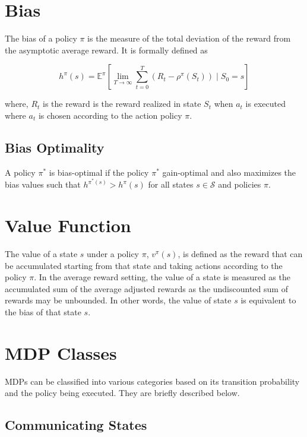\section{Bias}

The bias of a policy $\pi$ is the measure of the total deviation of the reward from the asymptotic average reward.
It is formally defined as

\begin{equation}
    \label{eqn:bias}
    h^\pi(s) = \mathbb{E}^\pi\left[\lim_{T \to \infty} \sum_{t=0}^{T} (R_t - \rho^\pi(S_t)) \mid S_0 = s\right]
\end{equation}

where, $R_t$ is the reward is the reward realized in state $S_t$ when $a_t$ is executed where $a_t$ is chosen according to the action policy $\pi$.

\subsection*{Bias Optimality}

A policy $\pi^*$ is bias-optimal if the policy $\pi^*$ gain-optimal and also maximizes the bias values such that $h^{\pi^*(s)} > h^\pi(s)$ for all states $s \in \mathcal{S}$ and policies $\pi$.

\section{Value Function}

The value of a state $s$ under a policy $\pi$, $v^\pi(s)$, is defined as the reward that can be accumulated starting from that state and taking actions according to the policy $\pi$. 
In the average reward setting, the value of a state is measured as the accumulated sum of the average adjusted rewards as the undiscounted sum of rewards may be unbounded.
In other words, the value of state $s$ is equivalent to the bias of that state $s$.

\section{MDP Classes}

MDPs can be classified into various categories based on its transition probability and the policy being executed. They are briefly described below.

\subsection{Communicating States}

